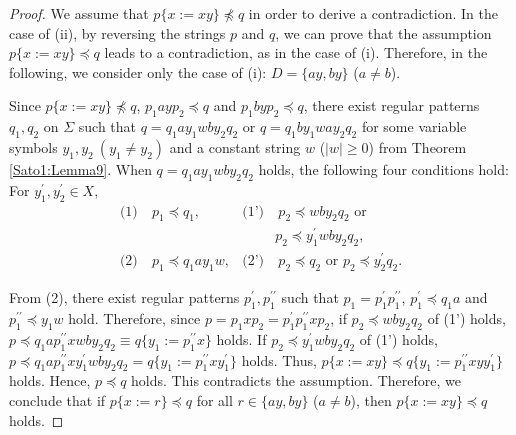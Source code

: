 \begin{proof}
We assume that $p \{ x := xy \} \not \preceq q$ in order to derive a contradiction.
In the case of \textrm{(ii)}, by reversing the strings $p$ and $q$, we can prove that the assumption $p \{ x := xy \} \preceq q$ leads to a contradiction, as in the case of \textrm{(i)}.
Therefore, in the following, we consider only the case of \textrm{(i)}: $D=\{ ay, by \}$ ($a \not= b$).

Since $p \{ x := xy \} \not \preceq q$, $p_{1}ayp_{2}\preceq q$ and $p_{1}byp_{2}\preceq q$, 
there exist regular patterns $q_{1},q_{2}$ on $\Sigma$ such that $q=q_{1}ay_{1}wby_{2}q_{2}$ or $q=q_{1}by_{1}way_{2}q_{2}$ for some variable symbols $y_{1},y_{2}~(y_{1} \not= y_{2})$ and a constant string $w$ ($|w|\geq 0$) from Theorem \ref{Sato1:Lemma9}.
When $q=q_{1}ay_{1}wby_{2}q_{2}$ holds, the following four conditions hold: For $y_{1}^{\prime}, y_{2}^{\prime}\in X$,
\begin{align*}
\textrm{(1)} & ~p_{1} \preceq q_{1}, & \textrm{(1')} & ~p_{2} \preceq wby_{2}q_{2} \mbox{~or~}\\
& & & p_{2} \preceq y_{1}^{\prime}wby_{2}q_{2},\\
\textrm{(2)} & ~p_{1} \preceq q_{1}ay_{1}w, & \textrm{(2')} & ~p_{2} \preceq q_{2} \mbox{~or~}
p_{2} \preceq y_{2}^{\prime}q_{2}.
\end{align*}

From (2), there exist regular patterns $p_{1}^{\prime},p_{1}^{\prime\prime}$ such that $p_{1}=p_{1}^{\prime}p_{1}^{\prime\prime}$, $p_{1}^{\prime} \preceq q_{1}a$ and $p_{1}^{\prime\prime} \preceq y_{1}w$ hold.
Therefore, since $p=p_{1}xp_{2}=p_{1}^{\prime}p_{1}^{\prime\prime}xp_{2}$,
if $p_{2} \preceq wby_{2}q_{2}$ of (1') holds, 
$p\preceq q_{1}ap_{1}^{\prime\prime}xwby_{2}q_{2}\equiv q \{ y_{1} := p_{1}^{\prime\prime}x \}$ holds.
If $p_2\preceq y_{1}^{\prime}wby_{2}q_{2}$ of (1') holds, $p\preceq q_{1}ap_{1}^{\prime\prime}xy_{1}^{\prime}wby_{2}q_{2}=q \{ y_{1} := p_{1}^{\prime\prime}xy_{1}^{\prime} \}$ holds.
Thus, $p\{x := xy\} \preceq q \{ y_{1} := p_{1}^{\prime\prime}xyy_{1}^{\prime} \}$ holds.
Hence, $p \preceq q$ holds.
This contradicts the assumption.
Therefore, we conclude that if $p \{ x := r \} \preceq q$ for all $r \in \{ ay, by \}$ ($a \not= b$), then $p \{ x := xy \} \preceq q$ holds.
\end{proof}

